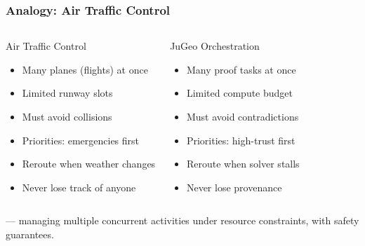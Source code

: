 \begin{frame}
\frametitle{Analogy: Air Traffic Control}
\begin{columns}[T]
\begin{block}{Air Traffic Control}
  \begin{itemize}
    \item Many planes (flights) at once
    \item Limited runway slots
    \item Must avoid collisions
    \item Priorities: emergencies first
    \item Reroute when weather changes
    \item Never lose track of anyone
  \end{itemize}
\end{block}
\begin{exampleblock}{JuGeo Orchestration}
  \begin{itemize}
    \item Many proof tasks at once
    \item Limited compute budget
    \item Must avoid contradictions
    \item Priorities: high-trust first
    \item Reroute when solver stalls
    \item Never lose provenance
  \end{itemize}
\end{exampleblock}
\end{columns}
\vfill
\begin{center}
 ---
managing multiple concurrent activities under resource constraints,
with safety guarantees.
\end{center}
\end{frame}

